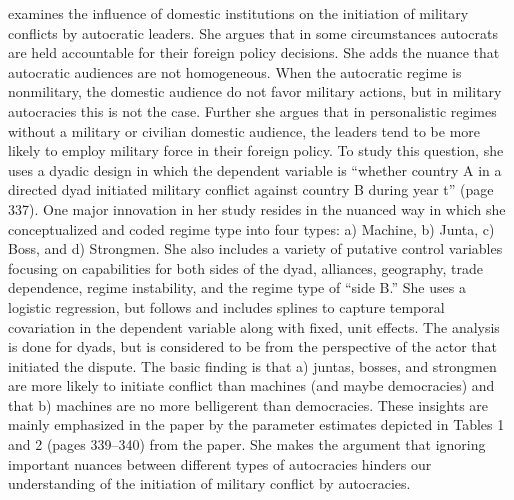 \citet{weeks:2012} examines the influence of domestic institutions on the initiation of military conflicts by autocratic leaders.  She argues that in some circumstances autocrats are held accountable for their foreign policy decisions. She adds the nuance that autocratic audiences are not homogeneous. When the autocratic regime is nonmilitary, the domestic audience do not favor military actions, but in military autocracies this is not the case. Further she argues that in personalistic regimes without a military or civilian domestic audience, the leaders tend to be more likely to employ military force in their foreign policy.  To study this question, she uses a dyadic design in which the dependent variable is ``whether country A in a directed dyad initiated military conflict against country B during year t'' (page 337).  One major innovation in her study resides in the nuanced way in which she conceptualized and coded regime type into four types: a) Machine, b) Junta, c) Boss, and d) Strongmen. She also includes a variety of putative control variables focusing on capabilities for both sides of the dyad, alliances, geography, trade dependence, regime instability, and the regime type of ``side B.''  She uses a logistic regression, but follows \citet{beck:etal:1998} and includes splines to capture temporal covariation in the dependent variable along with fixed, unit effects. The analysis is done for dyads, but is considered to be from the perspective of the actor that initiated the dispute. The basic finding is that a) juntas, bosses, and strongmen are more likely to initiate conflict than machines (and maybe democracies) and that b) machines are no more belligerent than democracies.  These insights are mainly emphasized in the paper by the parameter estimates depicted in Tables 1 and 2 (pages 339--340) from the paper. She makes the argument that ignoring important nuances between different types of autocracies hinders our understanding of the initiation of military conflict by autocracies. 

